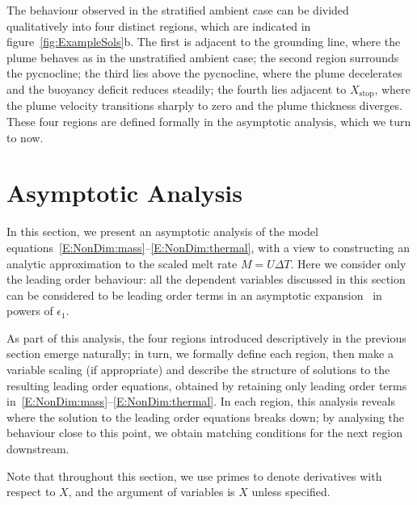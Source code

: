 \documentclass[openacc]{rsproca_new}%
\newcommand{\epsone}{\epsilon_{1}} %
\begin{document}
The behaviour observed in the stratified ambient case can be divided qualitatively into four distinct regions, which are indicated in figure~\ref{fig:ExampleSols}b. The first is adjacent to the grounding line, where the plume behaves as in the unstratified ambient case; the second region surrounds the pycnocline; the third lies above the pycnocline, where the plume decelerates and the buoyancy deficit reduces steadily; the fourth lies adjacent to $X_{\text{stop}}$, where the plume velocity transitions sharply to zero and the plume thickness diverges.  These four regions are defined formally in the asymptotic analysis, which we turn to now. 

\section{Asymptotic Analysis}\label{S:Asymptotics}
In this section, we present an asymptotic analysis of the model equations~\eqref{E:NonDim:mass}--\eqref{E:NonDim:thermal}, with a view to constructing an analytic approximation to the scaled melt rate $M = U \Delta T$. Here we consider only the leading order behaviour: all the dependent variables discussed in this section can be considered to be leading order terms in an asymptotic expansion~\citep{HinchPerturbationMethods} in powers of $\epsone$. 

As part of this analysis, the four regions introduced descriptively in the previous section emerge naturally; in turn, we formally define each region, then make a variable scaling (if appropriate) and describe the structure of solutions to the resulting leading order equations, obtained by retaining only leading order terms in~\eqref{E:NonDim:mass}--\eqref{E:NonDim:thermal}. In each region, this analysis reveals where the solution to the leading order equations breaks down; by analysing the behaviour close to this point, we obtain matching conditions for the next region downstream. %

Note that throughout this section, we use primes to denote derivatives with respect to $X$, and the argument of variables is $X$ unless specified.
\end{document}

